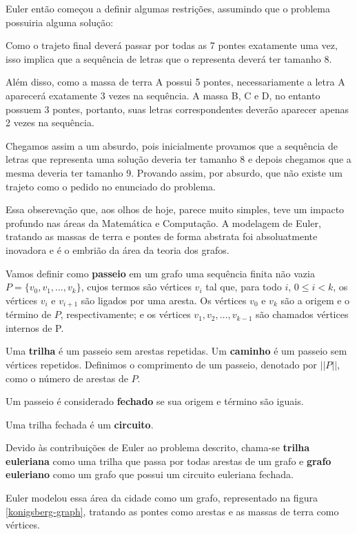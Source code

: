 \documentclass{article}
\begin{document}
Euler então começou a definir algumas restrições, assumindo que o problema possuiria alguma solução:

Como o trajeto final deverá passar por todas as 7 pontes exatamente uma vez, isso implica que a sequência de letras que o representa deverá ter tamanho 8.

Além disso, como a massa de terra A possui 5 pontes, necessariamente a letra A aparecerá exatamente 3 vezes na sequência.
A massa B, C e D, no entanto possuem 3 pontes, portanto, suas letras correspondentes deverão aparecer apenas 2 vezes na sequência. 

Chegamos assim a um absurdo, pois inicialmente provamos que a sequência de letras que representa uma solução deveria ter tamanho 8 e depois chegamos que a mesma deveria ter tamanho 9.
Provando assim, por absurdo, que não existe um trajeto como o pedido no enunciado do problema.


Essa obserevação que, aos olhos de hoje, parece muito simples, teve um impacto profundo nas áreas da Matemática e Computação.
A modelagem de Euler, tratando as massas de terra e pontes de forma abstrata foi absoluatmente inovadora e é o embrião da área da teoria dos grafos.


Vamos definir como \textbf{passeio} em um grafo uma sequência finita não vazia $P = \{ v_0, v_1, \dots, v_k\}$, cujos termos são vértices $v_i$ tal que, para todo $i$, $0 \leq i < k$, os vértices $v_{i}$ e $v_{i+1}$ são ligados por uma aresta. 
Os vértices $v_0$ e $v_k$ são a origem e o término de $P$, respectivamente; e os vértices $v_1, v_2, \dots, v_{k-1}$ são chamados vértices internos de P. 

Uma \textbf{trilha} é um passeio sem arestas repetidas. 
Um \textbf{caminho} é um passeio sem vértices repetidos.
Definimos o comprimento de um passeio, denotado por $||P||$, como o número de arestas de $P$.

Um passeio é considerado \textbf{fechado} se sua origem e término são iguais.

Uma trilha fechada é um \textbf{circuito}.

Devido às contribuições de Euler ao problema descrito, chama-se \textbf{trilha euleriana} como uma trilha que passa por todas arestas de um grafo e \textbf{grafo euleriano} como um grafo que possui um circuito euleriana fechada.

Euler modelou essa área da cidade como um grafo, representado na figura \ref{konigsberg-graph}, tratando as pontes como arestas e as massas de terra como vértices.
\end{document}

